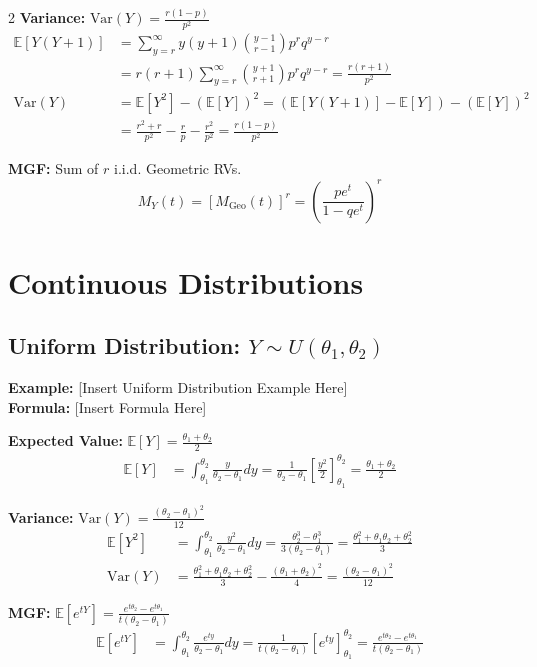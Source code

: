 \documentclass[11pt, letterpaper]{article}
\theoremstyle{definition}
\theoremstyle{remark}
\newcommand{\E}{\mathbb{E}}
\begin{document}
\begin{multicols*}{2}
\textbf{Variance:} $\text{Var}(Y) = \frac{r(1-p)}{p^2}$
\begin{align*}
\E[Y(Y+1)] &= \sum_{y=r}^{\infty} y(y+1)\binom{y-1}{r-1}p^r q^{y-r} \\
&= r(r+1)\sum_{y=r}^{\infty} \binom{y+1}{r+1}p^r q^{y-r} = \frac{r(r+1)}{p^2} \\
\text{Var}(Y) &= \E[Y^2] - (\E[Y])^2 = \left(\E[Y(Y+1)] - \E[Y]\right) - (\E[Y])^2 \\
&= \frac{r^2+r}{p^2} - \frac{r}{p} - \frac{r^2}{p^2} = \frac{r(1-p)}{p^2}
\end{align*}

\textbf{MGF:} Sum of $r$ i.i.d. Geometric RVs.
\[ M_Y(t) = [M_{\text{Geo}}(t)]^r = \left(\frac{pe^t}{1-qe^t}\right)^r \]

\section{Continuous Distributions}

\subsection{Uniform Distribution: $Y \sim U(\theta_1, \theta_2)$}
\textbf{Example:} [Insert Uniform Distribution Example Here] \\
\textbf{Formula:} [Insert Formula Here]

\textbf{Expected Value:} $\E[Y] = \frac{\theta_1 + \theta_2}{2}$
\begin{align*}
\E[Y] &= \int_{\theta_1}^{\theta_2} \frac{y}{\theta_2 - \theta_1} dy = \frac{1}{\theta_2 - \theta_1} \left[ \frac{y^2}{2} \right]_{\theta_1}^{\theta_2} = \frac{\theta_1 + \theta_2}{2}
\end{align*}

\textbf{Variance:} $\text{Var}(Y) = \frac{(\theta_2 - \theta_1)^2}{12}$
\begin{align*}
\E[Y^2] &= \int_{\theta_1}^{\theta_2} \frac{y^2}{\theta_2 - \theta_1} dy = \frac{\theta_2^3 - \theta_1^3}{3(\theta_2 - \theta_1)} = \frac{\theta_1^2 + \theta_1\theta_2 + \theta_2^2}{3} \\
\text{Var}(Y) &= \frac{\theta_1^2 + \theta_1\theta_2 + \theta_2^2}{3} - \frac{(\theta_1 + \theta_2)^2}{4} = \frac{(\theta_2 - \theta_1)^2}{12}
\end{align*}

\textbf{MGF:} $\E[e^{tY}] = \frac{e^{t\theta_2} - e^{t\theta_1}}{t(\theta_2 - \theta_1)}$
\begin{align*}
\E[e^{tY}] &= \int_{\theta_1}^{\theta_2} \frac{e^{ty}}{\theta_2 - \theta_1} dy = \frac{1}{t(\theta_2 - \theta_1)} \left[ e^{ty} \right]_{\theta_1}^{\theta_2} = \frac{e^{t\theta_2} - e^{t\theta_1}}{t(\theta_2 - \theta_1)}
\end{align*}


\end{multicols*}
\end{document}
